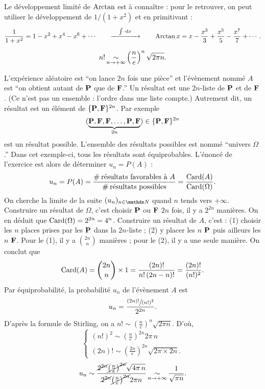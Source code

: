 Le développement limité de $\operatorname{Arctan}$\/ est à connaître : pour le retrouver, on peut utiliser le développement de $1 / (1 + x^2)$\/ et en primitivant : \[
	\frac{1}{1+x^2} = 1 - x^2 + x^4 - x^6 + \cdots \qquad \xrightarrow{\quad\int\cdot\mathrm{d}x\quad}\qquad \operatorname{Arctan} x = x - \frac{x^3}{3} + \frac{x^5}{5} - \frac{x^7}{7} + \cdots
.\]

\begin{prop}[Stirling]
	\[
		n! \operatorname*{\sim}_{n\to +\infty} \left( \frac{n}{e} \right)^n \sqrt{2\pi n}
	.\]
\end{prop}

\begin{exo}
	L'expérience aléatoire est ``on lance $2n$\/ fois une pièce'' et l'évènement nommé $A$\/ est ``on obtient autant de ${\bf P}$\/ que de ${\bf F}$.'' Un résultat est une $2n$-liste de ${\bf P}$\/ et de ${\bf F}$. (Ce n'est pas un ensemble : l'ordre dans une liste compte.) Autrement dit, un résultat est un élément de $\{{\bf P}, {\bf F}\}^{2n}$.
	Par exemple \[
		(\underbrace{{\bf P},{\bf F}, {\bf F}, \ldots, {\bf P},{\bf F}}_{2n}) \in \{{\bf P},{\bf F}\}^{2n}
	\] est un résultat possible. L'ensemble des résultats possibles est nommé ``univers $\Omega$.'' Dans cet exemple-ci, tous les résultats sont équiprobables. L'énoncé de l'exercice est alors de déterminer $u_n = P(A)$\/ : \[
		u_n = P(A) = \frac{\#\:\text{résultats favorables à } A}{\#\:\text{résultats possibles}} = \frac{\operatorname{Card}(A)}{\operatorname{Card}(\Omega)}
	.\]
	On cherche la limite de la suite $(u_n)_{n\in\N}$\/ quand $n$\/ tends vers $+\infty$.
	Construire un résultat de $\Omega$, c'est choisir ${\bf P}$\/ ou ${\bf F}$\/ $2n$\/ fois, il y a $2^{2n}$\/ manières. On en déduit que $\operatorname{Card}(\Omega) = 2^{2n} = 4^n$.
	Construire un résultat de $A$, c'est : (1) choisir les $n$\/ places prises par les ${\bf P}$\/ dans la $2n$-liste ; (2) y placer les $n$\/ ${\bf P}$\/ puis ailleurs les $n$\/ ${\bf F}$.
	Pour le (1), il y a ${2n\choose n}$\/ manières ; pour le (2), il y a une seule manière. On conclut que \[
		\operatorname{Card}(A) = {2n\choose n} \times 1 = \frac{(2n)!}{n!\,(2n-n)!} = \frac{(2n)!}{(n!)^2}
	.\] Par équiprobabilité, la probabilité $u_n$\/ de l'évènement $A$\/ est \[
		u_n = \frac{\sfrac{(2n)!}{(n!)^2}}{2^{2n}}
	.\] D'après la formule de {\sc Stirling}, on a $n! \sim \left( \frac{n}{e} \right)^n \sqrt{2\pi n}$. D'où, \[
		\begin{cases}
			(n!)^2 \sim \left( \frac{n}{e} \right)^{2n} 2\pi\,n\\
			(2n)! \sim \left( \frac{2n}{e} \right)^{2n} \sqrt{2\pi\times 2n}.
		\end{cases}
	\] \[
		u_n \sim \frac{\cancel{2^{2n}} \cancel{\left( \frac{n}{e} \right)^{2n}} \sqrt{4\pi\,n}}{\cancel{2^{2n}}\cancel{\left( \frac{n}{e} \right)^{2n}} 2\pi n} \operatorname*{\sim}_{n\to +\infty} \frac{1}{\sqrt{\pi n}}
	.\]
\end{exo}
